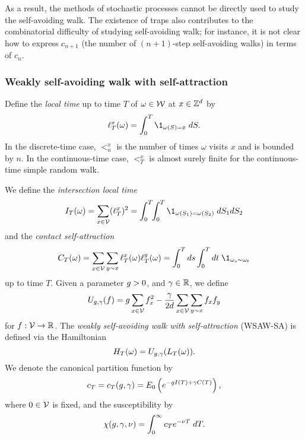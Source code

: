 As a result, the methods of stochastic processes cannot be directly used to study the self-avoiding
walk. The existence of traps also contributes to the combinatorial difficulty of studying
self-avoiding walk; for instance, it is not clear how to express $c_{n+1}$ (the number of
$(n+1)$-step self-avoiding walks) in terms of $c_n$.



\subsubsection{Weakly self-avoiding walk with self-attraction}

Define the \emph{local time} up to time $T$ of $\omega \in \mathcal{W}$ at $x \in { {{\mathbb Z}}^d }$ by
\begin{equation}
\lt^x_T(\omega) = \int_0^T \1_{\omega(S)=x} \; dS.
\end{equation}
In the discrete-time case, $\lt^x_n$ is the number of times $\omega$ visits $x$
and is bounded by $n$. In the continuous-time case, $\lt^x_T$ is almost surely
finite for the continuous-time simple random walk.

We define the \emph{intersection local time}
\begin{equation}
\label{e:ITdef}
I_T(\omega) = \sum_{x\in\vertices} (\lt^x_T)^2
  =
\int_0^T \!\! \int_0^T \1_{\omega(S_1)=\omega(S_2)} \; dS_1 dS_2
\end{equation}
and the \emph{contact self-attraction}
\begin{equation}
\label{e:CTdef}
C_T(\omega) =
  \sum_{x \in \vertices} \sum_{y \sim x} \lt_T^x(\omega) \lt_T^y(\omega)
  = \int_0^T ds \int_0^T dt \; \1_{\omega_{s} \sim \omega_{t}}
\end{equation}
up to time $T$.
Given a parameter $g > 0$,
and $\gamma \in {\mathbb R}$, we define
\begin{equation}
\label{e:Udef-neg}
U_{g,\gamma}(f)
=
g \sum_{x\in\mathcal{V}} f_x^2
- \frac{\gamma}{2d}
\sum_{x\in\mathcal{V}} \sum_{y \sim x} f_x f_y
\end{equation}
for $f : \mathcal{V} \rightarrow {\mathbb R}$.
The \emph{weakly self-avoiding walk with self-attraction} (WSAW-SA) is defined via
the Hamiltonian
\begin{equation}
H_T(\omega) = U_{g,\gamma}(L_T(\omega)).
\end{equation}
We denote the canonical partition function by
\begin{equation}
c_T = c_T(g, \gamma) = E_0 \left( e^{-g I(T) + \gamma C(T)} \right),
\end{equation}
where $0 \in \mathcal{V}$ is fixed, and the susceptibility by
\begin{equation}
\chi(g, \gamma, \nu) = \int_0^\infty c_T e^{-\nu T} \; dT.
\end{equation}

